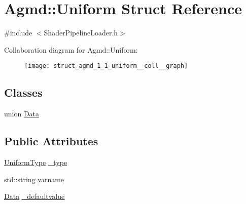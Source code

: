 \hypertarget{struct_agmd_1_1_uniform}{\section{Agmd\+:\+:Uniform Struct Reference}
\label{struct_agmd_1_1_uniform}
}


{\ttfamily \#include $<$Shader\+Pipeline\+Loader.\+h$>$}



Collaboration diagram for Agmd\+:\+:Uniform\+:\nopagebreak
\begin{figure}[H]
\begin{center}
\leavevmode
\texttt{[image: struct\_agmd\_1\_1\_uniform\_\_coll\_\_graph]}
\end{center}
\end{figure}
\subsection*{Classes}
\begin{DoxyCompactItemize}
\item 
union \hyperlink{union_agmd_1_1_uniform_1_1_data}{Data}
\end{DoxyCompactItemize}
\subsection*{Public Attributes}
\begin{DoxyCompactItemize}
\item 
\hyperlink{namespace_agmd_a3d4304962f298f9f7b89bfc880959c4a}{Uniform\+Type} \hyperlink{struct_agmd_1_1_uniform_ad4070c0c634a0e3ced8272165dc4a1d4}{\+\_\+type}
\item 
std\+::string \hyperlink{struct_agmd_1_1_uniform_a279f442125b88f35673cf735f7795381}{varname}
\item 
\hyperlink{union_agmd_1_1_uniform_1_1_data}{Data} \hyperlink{struct_agmd_1_1_uniform_a4256fb764fb19c54f5591e928dce21e4}{\+\_\+defaultvalue}
\end{DoxyCompactItemize}


